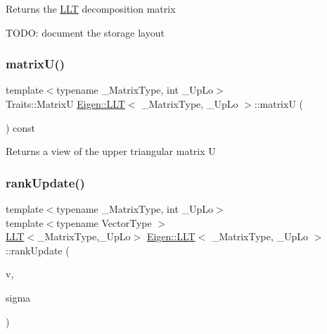 \begin{DoxyReturn}{Returns}
the \mbox{\hyperlink{class_eigen_1_1_l_l_t}{L\+LT}} decomposition matrix
\end{DoxyReturn}
T\+O\+DO\+: document the storage layout \mbox{\label{class_eigen_1_1_l_l_t_a18a390f085567e650e8345cc7e7c0df8}} 
\subsubsection{\texorpdfstring{matrixU()}{matrixU()}}
{\footnotesize\ttfamily template$<$typename \+\_\+\+Matrix\+Type, int \+\_\+\+Up\+Lo$>$ \\
Traits\+::\+MatrixU \mbox{\hyperlink{class_eigen_1_1_l_l_t}{Eigen\+::\+L\+LT}}$<$ \+\_\+\+Matrix\+Type, \+\_\+\+Up\+Lo $>$\+::matrixU (\begin{DoxyParamCaption}{ }\end{DoxyParamCaption}) const\hspace{0.3cm}{\ttfamily [inline]}}

\begin{DoxyReturn}{Returns}
a view of the upper triangular matrix U 
\end{DoxyReturn}
\mbox{\label{class_eigen_1_1_l_l_t_aae1ee59cb3c46723721da6fd72acc21a}} 
\subsubsection{\texorpdfstring{rankUpdate()}{rankUpdate()}}
{\footnotesize\ttfamily template$<$typename \+\_\+\+Matrix\+Type, int \+\_\+\+Up\+Lo$>$ \\
template$<$typename Vector\+Type $>$ \\
\mbox{\hyperlink{class_eigen_1_1_l_l_t}{L\+LT}}$<$\+\_\+\+Matrix\+Type,\+\_\+\+Up\+Lo$>$ \mbox{\hyperlink{class_eigen_1_1_l_l_t}{Eigen\+::\+L\+LT}}$<$ \+\_\+\+Matrix\+Type, \+\_\+\+Up\+Lo $>$\+::rank\+Update (\begin{DoxyParamCaption}\item[{const Vector\+Type \&}]{v,  }\item[{const Real\+Scalar \&}]{sigma }\end{DoxyParamCaption})}

